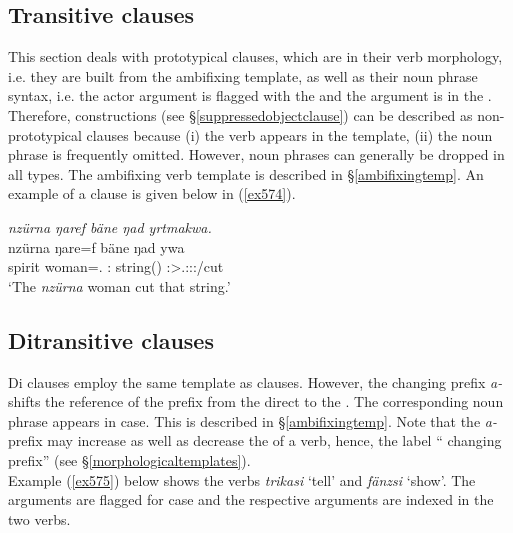 \subsection{Transitive clauses}\label{transitiveclause}

This section deals with prototypical  clauses, which are  in their verb morphology, i.e. they are built from the ambifixing  template, as well as their noun phrase syntax, i.e. the actor argument is flagged with the  and the  argument is in the . Therefore,  constructions (see \S{}\ref{suppressedobjectclause}) can be described as non-prototypical  clauses because (i) the verb appears in the  template, (ii) the  noun phrase is frequently omitted. However, noun phrases can generally be dropped in all  types. The ambifixing verb template is described in \S{}\ref{ambifixingtemp}. An example of a  clause is given below in (\ref{ex574}).

\begin{exe}
	\ex \emph{nzürna ŋaref bäne ŋad yrtmakwa.}\\
	\gll nzürna ŋare=f bäne ŋad ywa\\
	spirit woman=\Erg.\Sg{} \Dem:\Med{} string(\Abs) \Sg:\Sbj>\Tsg.\Masc:\Obj:\Pst:\Ipfv/cut\\
	\trans `The \emph{nzürna} woman cut that string.'
	\label{ex574}
\end{exe}

\subsection{Ditransitive clauses}\label{ditransitiveclause}

Di clauses employ the same template as  clauses. However, the  changing prefix \emph{a-} shifts the reference of the  prefix from the direct  to the . The corresponding noun phrase appears in  case. This is described in \S{}\ref{ambifixingtemp}. Note that the \emph{a-} prefix may increase as well as decrease the  of a verb, hence, the label `` changing prefix'' (see \S{}\ref{morphologicaltemplates}).\\

Example (\ref{ex575}) below shows the verbs \emph{trikasi} `tell' and \emph{fänzsi} `show'. The  arguments are flagged for  case and the respective arguments are indexed in the two verbs.\\

